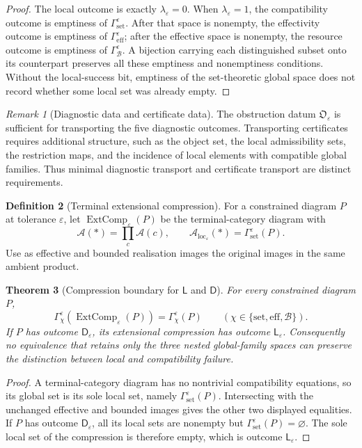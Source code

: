 \documentclass[11pt]{article}
\theoremstyle{plain}
\newtheorem{theorem}{Theorem}[section]
\theoremstyle{definition}
\newtheorem{definition}[theorem]{Definition}
\theoremstyle{remark}
\newtheorem{remark}[theorem]{Remark}
\newcommand{\LocalAdm}{\mathcal{A}_{\mathrm{loc}}}
\newcommand{\eps}{\varepsilon}
\begin{document}
\begin{proof}
The local outcome is exactly $\lambda_\eps=0$. When $\lambda_\eps=1$, the
compatibility outcome is emptiness of $\Gamma_{\mathrm{set}}^\eps$. After that
space is nonempty, the effectivity outcome is emptiness of
$\Gamma_{\mathrm{eff}}^\eps$; after the effective space is nonempty, the
resource outcome is emptiness of $\Gamma_{\mathcal B}^\eps$. A bijection
carrying each distinguished subset onto its counterpart preserves all these
emptiness and nonemptiness conditions. Without the local-success bit, emptiness
of the set-theoretic global space does not record whether some local set was
already empty.
\end{proof}

\begin{remark}[Diagnostic data and certificate data]
The obstruction datum $\mathfrak O_\eps$ is sufficient for transporting the
five diagnostic outcomes. Transporting certificates requires additional
structure, such as the object set, the local admissibility sets, the restriction
maps, and the incidence of local elements with compatible global families. Thus
minimal diagnostic transport and certificate transport are distinct requirements.
\end{remark}

\begin{definition}[Terminal extensional compression]
\label{def:extensional-compression}
For a constrained diagram $P$ at tolerance $\eps$, let
$\operatorname{ExtComp}_\eps(P)$ be the terminal-category diagram with
\[
\mathcal A(*)=\prod_c\mathcal A(c),
\qquad
\LocalAdm_\eps(*)=\Gamma_{\mathrm{set}}^\eps(P).
\]
Use as effective and bounded realisation images the original images in the same
ambient product.
\end{definition}

\begin{theorem}[Compression boundary for $\mathsf L$ and $\mathsf D$]
\label{thm:compression-boundary}
For every constrained diagram $P$,
\[
\Gamma_\chi^\eps(\operatorname{ExtComp}_\eps(P))
=\Gamma_\chi^\eps(P)
\qquad
(\chi\in\{\mathrm{set},\mathrm{eff},\mathcal B\}).
\]
If $P$ has outcome $\mathsf D_\eps$, its extensional compression has outcome
$\mathsf L_\eps$. Consequently no equivalence that retains only the three
nested global-family spaces can preserve the distinction between local and
compatibility failure.
\end{theorem}

\begin{proof}
A terminal-category diagram has no nontrivial compatibility equations, so its global
set is its sole local set, namely $\Gamma_{\mathrm{set}}^\eps(P)$. Intersecting
with the unchanged effective and bounded images gives the other two displayed
equalities. If $P$ has outcome $\mathsf D_\eps$, all its local sets are nonempty
but $\Gamma_{\mathrm{set}}^\eps(P)=\varnothing$. The sole local set of the
compression is therefore empty, which is outcome $\mathsf L_\eps$.
\end{proof}
\end{document}
